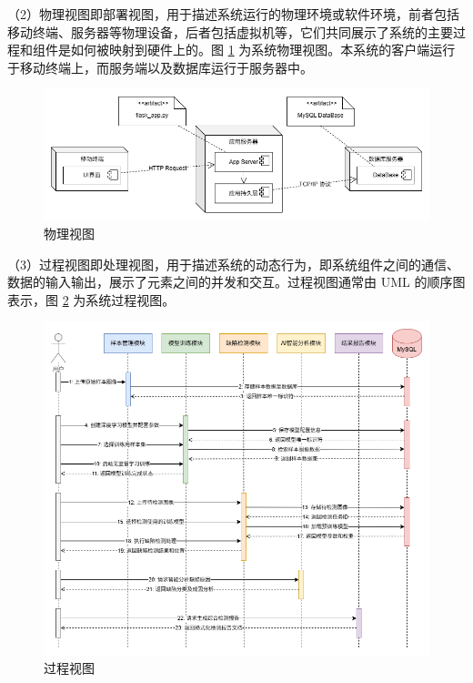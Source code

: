 \documentclass[
  ]{njuthesis}
\begin{document}
（2）物理视图即部署视图，用于描述系统运行的物理环境或软件环境，前者包括移动终端、服务器等物理设备，后者包括虚拟机等，它们共同展示了系统的主要过程和组件是如何被映射到硬件上的。图 \ref{物理视图} 为系统物理视图。本系统的客户端运行于移动终端上，而服务端以及数据库运行于服务器中。

\begin{figure}[H]
    \centering
    \includegraphics[width=\textwidth]{images/物理视图.png}
    \caption{物理视图}
    \label{物理视图}
\end{figure}

（3）过程视图即处理视图，用于描述系统的动态行为，即系统组件之间的通信、数据的输入输出，展示了元素之间的并发和交互。过程视图通常由 UML 的顺序图表示，图 \ref{过程视图} 为系统过程视图。

\begin{figure}[H]
    \centering
    \includegraphics[width=\textwidth]{images/过程视图.png}
    \caption{过程视图}
    \label{过程视图}
\end{figure}
\end{document}
